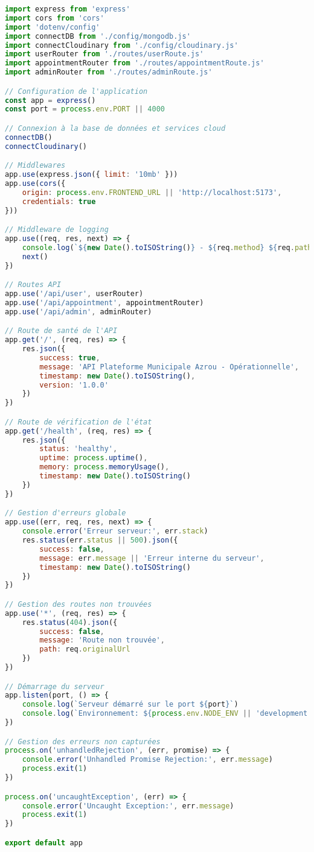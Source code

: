 \begin{lstlisting}[language=JavaScript, caption=server.js - Configuration du serveur]
import express from 'express'
import cors from 'cors'
import 'dotenv/config'
import connectDB from './config/mongodb.js'
import connectCloudinary from './config/cloudinary.js'
import userRouter from './routes/userRoute.js'
import appointmentRouter from './routes/appointmentRoute.js'
import adminRouter from './routes/adminRoute.js'

// Configuration de l'application
const app = express()
const port = process.env.PORT || 4000

// Connexion à la base de données et services cloud
connectDB()
connectCloudinary()

// Middlewares
app.use(express.json({ limit: '10mb' }))
app.use(cors({
    origin: process.env.FRONTEND_URL || 'http://localhost:5173',
    credentials: true
}))

// Middleware de logging
app.use((req, res, next) => {
    console.log(`${new Date().toISOString()} - ${req.method} ${req.path}`)
    next()
})

// Routes API
app.use('/api/user', userRouter)
app.use('/api/appointment', appointmentRouter)
app.use('/api/admin', adminRouter)

// Route de santé de l'API
app.get('/', (req, res) => {
    res.json({
        success: true,
        message: 'API Plateforme Municipale Azrou - Opérationnelle',
        timestamp: new Date().toISOString(),
        version: '1.0.0'
    })
})

// Route de vérification de l'état
app.get('/health', (req, res) => {
    res.json({
        status: 'healthy',
        uptime: process.uptime(),
        memory: process.memoryUsage(),
        timestamp: new Date().toISOString()
    })
})

// Gestion d'erreurs globale
app.use((err, req, res, next) => {
    console.error('Erreur serveur:', err.stack)
    res.status(err.status || 500).json({
        success: false,
        message: err.message || 'Erreur interne du serveur',
        timestamp: new Date().toISOString()
    })
})

// Gestion des routes non trouvées
app.use('*', (req, res) => {
    res.status(404).json({
        success: false,
        message: 'Route non trouvée',
        path: req.originalUrl
    })
})

// Démarrage du serveur
app.listen(port, () => {
    console.log(`Serveur démarré sur le port ${port}`)
    console.log(`Environnement: ${process.env.NODE_ENV || 'development'}`)
})

// Gestion des erreurs non capturées
process.on('unhandledRejection', (err, promise) => {
    console.error('Unhandled Promise Rejection:', err.message)
    process.exit(1)
})

process.on('uncaughtException', (err) => {
    console.error('Uncaught Exception:', err.message)
    process.exit(1)
})

export default app
\end{lstlisting}

